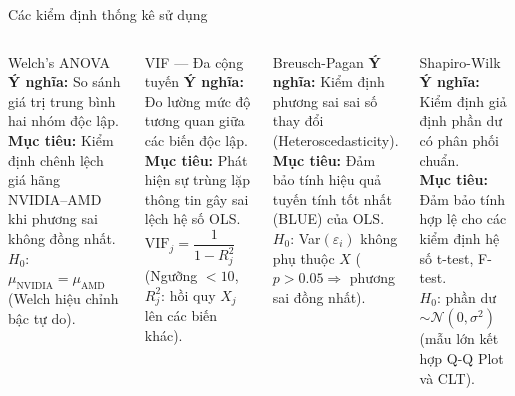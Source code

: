 \documentclass[13pt, aspectratio=169]{beamer}
\begin{document}
\begin{frame}{Các kiểm định thống kê sử dụng}
  \begin{columns}[T]
      \begin{block}{Welch's ANOVA}
        \scriptsize
        \textbf{Ý nghĩa:} So sánh giá trị trung bình hai nhóm độc lập.\\
        \textbf{Mục tiêu:} Kiểm định chênh lệch giá hãng NVIDIA--AMD khi phương sai không đồng nhất.\\
        $H_0$: $\mu_{\text{NVIDIA}} = \mu_{\text{AMD}}$ (Welch hiệu chỉnh bậc tự do).
      \end{block}
      \vspace{0.4em}
      \begin{block}{VIF --- Đa cộng tuyến}
        \scriptsize
        \textbf{Ý nghĩa:} Đo lường mức độ tương quan giữa các biến độc lập.\\
        \textbf{Mục tiêu:} Phát hiện sự trùng lặp thông tin gây sai lệch hệ số OLS.\\
        $\text{VIF}_j = \dfrac{1}{1 - R^2_j}$ (Ngưỡng $< 10$, $R^2_j$: hồi quy $X_j$ lên các biến khác).
      \end{block}
      \begin{block}{Breusch-Pagan}
        \scriptsize
        \textbf{Ý nghĩa:} Kiểm định phương sai sai số thay đổi (Heteroscedasticity).\\
        \textbf{Mục tiêu:} Đảm bảo tính hiệu quả tuyến tính tốt nhất (BLUE) của OLS.\\
        $H_0$: Var$(\varepsilon_i)$ không phụ thuộc $X$ ($p > 0.05 \Rightarrow$ phương sai đồng nhất).
      \end{block}
      \vspace{0.4em}
      \begin{block}{Shapiro-Wilk}
        \scriptsize
        \textbf{Ý nghĩa:} Kiểm định giả định phần dư có phân phối chuẩn.\\
        \textbf{Mục tiêu:} Đảm bảo tính hợp lệ cho các kiểm định hệ số t-test, F-test.\\
        $H_0$: phần dư $\sim \mathcal{N}(0, \sigma^2)$ (mẫu lớn kết hợp Q-Q Plot và CLT).
      \end{block}
  \end{columns}
\end{frame}
\end{document}
